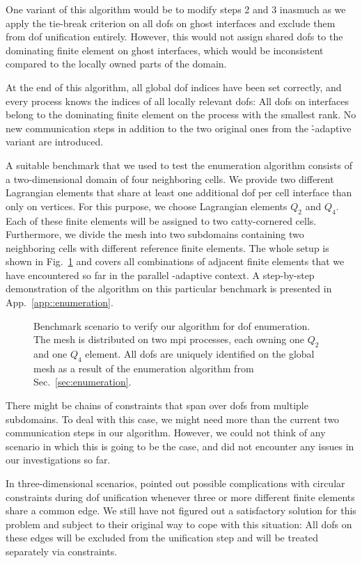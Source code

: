 One variant of this algorithm would be to modify steps 2 and 3 inasmuch as we apply the tie-break criterion on all \glspl{dof} on ghost interfaces and exclude them from \gls{dof} unification entirely. However, this would not assign shared \glspl{dof} to the dominating finite element on ghost interfaces, which would be inconsistent compared to the locally owned parts of the domain.

At the end of this algorithm, all global \gls{dof} indices have been set correctly, and every process knows the indices of all locally relevant \glspl{dof}: All \glspl{dof} on interfaces belong to the dominating finite element on the process with the smallest rank. No new communication steps in addition to the two original ones from the \h-adaptive variant are introduced.

A suitable benchmark that we used to test the enumeration algorithm consists of a two-dimensional domain of four neighboring cells. We provide two different Lagrangian elements that share at least one additional \gls{dof} per cell interface than only on vertices. For this purpose, we choose Lagrangian elements $Q_2$ and $Q_4$. Each of these finite elements will be assigned to two catty-cornered cells. Furthermore, we divide the mesh into two subdomains containing two neighboring cells with different reference finite elements. The whole setup is shown in Fig.~\ref{fig:enumbenchmark} and covers all combinations of adjacent finite elements that we have encountered so far in the parallel \hp-adaptive context. A step-by-step demonstration of the algorithm on this particular benchmark is presented in App.~\ref{app::enumeration}.

\begin{figure}
\centering


\caption[Benchmark scenario for  enumeration.]{Benchmark scenario to verify our algorithm for \gls{dof} enumeration. The mesh is distributed on two \gls{mpi} processes, each owning one $Q_2$ and one $Q_4$ element. All \glspl{dof} are uniquely identified on the global mesh as a result of the enumeration algorithm from Sec.~\ref{sec:enumeration}.}
\label{fig:enumbenchmark}
\end{figure}

There might be chains of constraints that span over \glspl{dof} from multiple subdomains. To deal with this case, we might need more than the current two communication steps in our algorithm. However, we could not think of any scenario in which this is going to be the case, and did not encounter any issues in our investigations so far.

In three-dimensional scenarios, \textcite[Sec.~4.6]{bangerth2009} pointed out possible complications with circular constraints during \gls{dof} unification whenever three or more different finite elements share a common edge. We still have not figured out a satisfactory solution for this problem and subject to their original way to cope with this situation: All \glspl{dof} on these edges will be excluded from the unification step and will be treated separately via constraints.
